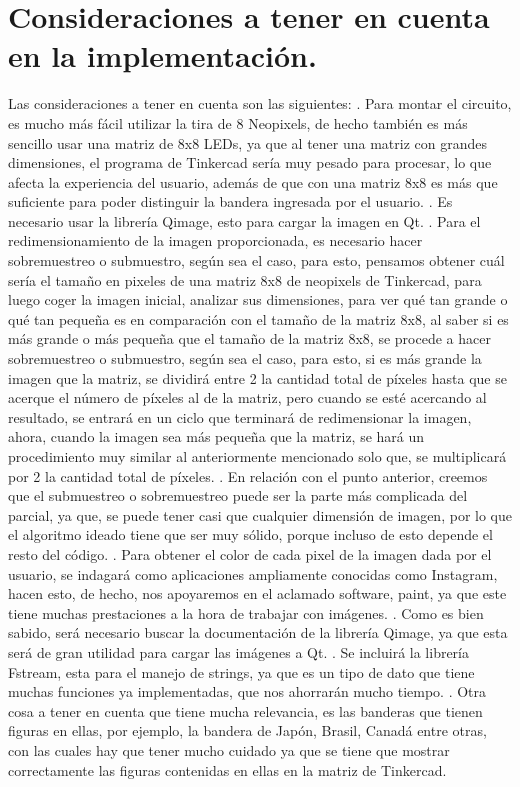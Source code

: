 \documentclass{article}
\begin{document}
\section{Consideraciones a tener en cuenta en la implementación.}
Las consideraciones a tener en cuenta son las siguientes: 
. Para montar el circuito, es mucho más fácil utilizar la tira de 8 Neopixels, de hecho también es más sencillo usar una matriz de 8x8 LEDs, ya que al tener una matriz con grandes dimensiones, el programa de Tinkercad sería muy pesado para procesar, lo que afecta la experiencia del usuario, además de que con una matriz 8x8 es más que suficiente para poder distinguir la bandera ingresada por el usuario.
. Es necesario usar la librería Qimage, esto para cargar la imagen en Qt. 
. Para el redimensionamiento de la imagen proporcionada, es necesario hacer sobremuestreo o submuestro, según sea el caso, para esto, pensamos obtener cuál sería el tamaño en pixeles de una matriz 8x8 de neopixels de Tinkercad, para luego coger la imagen inicial, analizar sus dimensiones, para ver qué tan grande o qué tan pequeña es en comparación con el tamaño de la matriz 8x8, al saber si es más grande o más pequeña que el tamaño de la matriz 8x8, se procede a hacer sobremuestreo o submuestro, según sea el caso, para esto, si es más grande la imagen que la matriz, se dividirá entre 2 la cantidad total de píxeles hasta que se acerque el número de píxeles al de la matriz, pero cuando se esté acercando al resultado, se entrará en un ciclo que terminará de redimensionar la imagen, ahora, cuando la imagen sea más pequeña que la matriz, se hará un procedimiento muy similar al anteriormente mencionado solo que, se multiplicará por 2 la cantidad total de píxeles.
. En relación con el punto anterior, creemos que el submuestreo o sobremuestreo puede ser la parte más complicada del parcial, ya que, se puede tener casi que cualquier dimensión de imagen, por lo que el algoritmo ideado tiene que ser muy sólido, porque incluso de esto depende el resto del código.  
. Para obtener el color de cada pixel de la imagen dada por el usuario, se indagará como aplicaciones ampliamente conocidas como Instagram, hacen esto, de hecho, nos apoyaremos en el aclamado software, paint, ya que este tiene muchas prestaciones a la hora de trabajar con imágenes.
. Como es bien sabido, será necesario buscar la documentación de la librería Qimage, ya que esta será de gran utilidad para cargar las imágenes a Qt. 
. Se incluirá la librería Fstream, esta para el manejo de strings, ya que es un tipo de dato que tiene muchas funciones ya implementadas, que nos ahorrarán mucho tiempo. 
. Otra cosa a tener en cuenta que tiene mucha relevancia, es las banderas que tienen figuras en ellas, por ejemplo, la bandera de Japón, Brasil, Canadá entre otras, con las cuales hay que tener mucho cuidado ya que se tiene que mostrar correctamente las figuras contenidas en ellas en la matriz de Tinkercad. 
\end{document}

